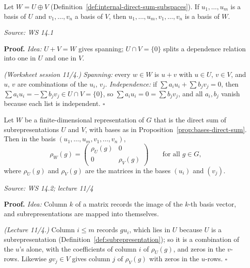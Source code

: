 \documentclass[11pt]{report}
\renewenvironment{proof}[1][Proof]{\noindent\textbf{#1.} }{\hfill$\square$\par\vspace{5pt}}
\newcommand{\srcline}[1]{\par\hfill{\footnotesize\textit{Source: #1}}}
\begin{document}
\begin{propbox}\label{prop:bases-direct-sum}
Let $W = U \oplus V$ (Definition~\ref{def:internal-direct-sum-subspaces}). If $u_1, \ldots, u_m$ is a basis of $U$ and $v_1, \ldots, v_n$ a basis of $V$, then $u_1, \ldots, u_m, v_1, \ldots, v_n$ is a basis of $W$.
\srcline{WS 14.1}
\end{propbox}

\begin{proof}
\textit{Idea:} $U + V = W$ gives spanning; $U \cap V = \{0\}$ splits a dependence relation into one in $U$ and one in $V$.\par
\textit{(Worksheet session 11/4.)} \emph{Spanning:} every $w \in W$ is $u + v$ with $u \in U$, $v \in V$, and $u$, $v$ are combinations of the $u_i$, $v_j$. \emph{Independence:} if $\sum a_i u_i + \sum b_j v_j = 0$, then $\sum a_i u_i = -\sum b_j v_j \in U \cap V = \{0\}$, so $\sum a_i u_i = 0 = \sum b_j v_j$, and all $a_i, b_j$ vanish because each list is independent.
\end{proof}

\begin{propbox}\label{prop:direct-sum-block-diagonal}
Let $W$ be a finite-dimensional representation of $G$ that is the direct sum of subrepresentations $U$ and $V$, with bases as in Proposition~\ref{prop:bases-direct-sum}. Then in the basis $(u_1, \ldots, u_m, v_1, \ldots, v_n)$,
\[ \rho_W(g) = \begin{pmatrix} \rho_U(g) & 0 \\ 0 & \rho_V(g) \end{pmatrix} \qquad \text{for all } g \in G, \]
where $\rho_U(g)$ and $\rho_V(g)$ are the matrices in the bases $(u_i)$ and $(v_j)$.
\srcline{WS 14.2; lecture 11/4}
\end{propbox}

\begin{proof}
\textit{Idea:} Column $k$ of a matrix records the image of the $k$-th basis vector, and subrepresentations are mapped into themselves.\par
\textit{(Lecture 11/4.)} Column $i \leq m$ records $gu_i$, which lies in $U$ because $U$ is a subrepresentation (Definition~\ref{def:subrepresentation}); so it is a combination of the $u$'s alone, with the coefficients of column $i$ of $\rho_U(g)$, and zeros in the $v$-rows. Likewise $gv_j \in V$ gives column $j$ of $\rho_V(g)$ with zeros in the $u$-rows.
\end{proof}
\end{document}
